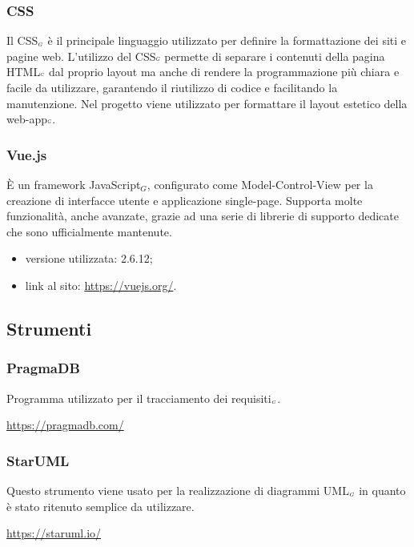 \subsubsection{CSS}\label{ProcessiPrimariCodificaCSS}
Il CSS$_{\scaleto{G}{3pt}}$ è il principale linguaggio utilizzato per definire la formattazione dei siti e pagine web.
L'utilizzo del CSS${\scaleto{G}{3pt}}$ permette di separare i contenuti della pagina HTML${\scaleto{G}{3pt}}$ dal proprio layout ma anche di rendere la programmazione più chiara e facile da utilizzare, garantendo il riutilizzo di codice e facilitando la manutenzione.
Nel progetto viene utilizzato per formattare il layout estetico della web-app${\scaleto{G}{3pt}}$.

\subsubsection{Vue.js}\label{ProcessiPrimariCodificaVue}
È un framework JavaScript$_G$, configurato come Model-Control-View per la creazione di interfacce utente e applicazione single-page.
Supporta molte funzionalità, anche avanzate, grazie ad una serie di librerie di supporto dedicate che sono ufficialmente mantenute.

\begin{itemize}
	\item versione utilizzata: 2.6.12;
	\item link al sito: \url{https://vuejs.org/}.
\end{itemize}

\subsection{Strumenti}\label{ProcessiPrimariStrumenti}

\subsubsection{PragmaDB}\label{ProcessiPrimariStrumentiPragmaDB}
Programma utilizzato per il tracciamento dei requisiti$_{\scaleto{G}{3pt}}$.
\begin{center}
	\url{https://pragmadb.com/}
\end{center}
\subsubsection{StarUML}\label{ProcessiPrimariStrumentiDrawIo}
Questo strumento viene usato per la realizzazione di diagrammi UML$_{\scaleto{G}{3pt}}$ in quanto è stato ritenuto semplice da utilizzare.
\begin{center}
	\url{https://staruml.io/}
\end{center}
